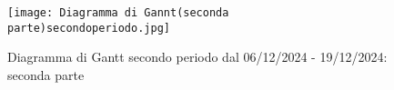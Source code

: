 \newpage

\begin{figure}[h] 
    \centering
    \texttt{[image: Diagramma di Gannt(seconda parte)secondoperiodo.jpg]}
    \caption{Diagramma di Gantt secondo periodo dal 06/12/2024 - 19/12/2024: seconda parte} 
    \label{fig: Diagramma di Gantt primo periodo dal 06/12/2024 - 19/12/2024: seconda parte}
\end{figure}

\newpage